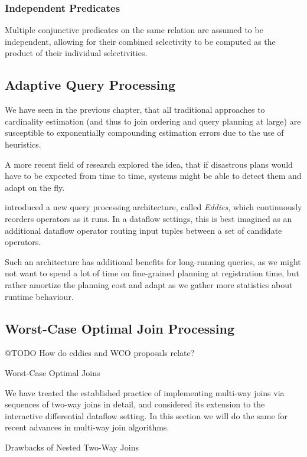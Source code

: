 \documentclass[../index.tex]{subfiles}
\begin{document}
\subsubsection{Independent Predicates}

Multiple conjunctive predicates on the same relation are assumed to be
independent, allowing for their combined selectivity to be computed as
the product of their individual selectivities.

\subsection{Adaptive Query Processing}

We have seen in the previous chapter, that all traditional approaches
to cardinality estimation (and thus to join ordering and query
planning at large) are susceptible to exponentially compounding
estimation errors due to the use of heuristics.

A more recent field of research explored the idea, that if disastrous
plans would have to be expected from time to time, systems might be
able to detect them and adapt on the fly.

\cite{avnur2000eddies} introduced a new query processing architecture,
called \emph{Eddies}, which continuously reorders operators as it
runs. In a dataflow settings, this is best imagined as an additional
dataflow operator routing input tuples between a set of candidate
operators.

Such an architecture has additional benefits for long-running queries,
as we might not want to spend a lot of time on fine-grained planning
at registration time, but rather amortize the planning cost and adapt
as we gather more statistics about runtime behaviour.

\subsection{Worst-Case Optimal Join Processing}

@TODO How do eddies and WCO proposals relate?

Worst-Case Optimal Joins

We have treated the established practice of implementing multi-way
joins via sequences of two-way joins in detail, and considered its
extension to the interactive differential dataflow setting. In this
section we will do the same for recent advances in multi-way join
algorithms.

Drawbacks of Nested Two-Way Joins
\end{document}
